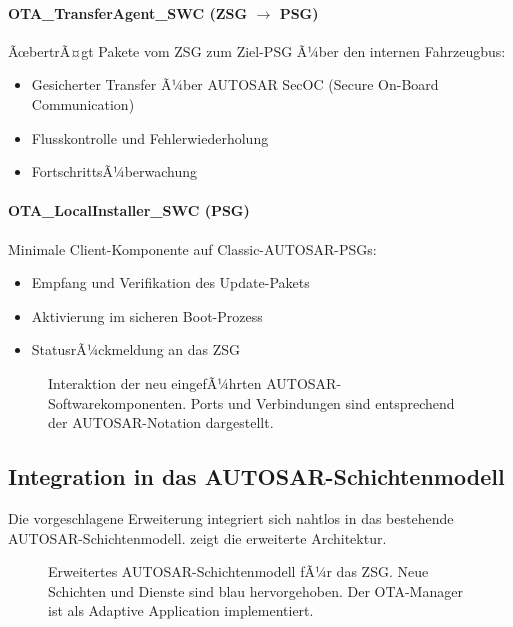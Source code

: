 ﻿\documentclass[12pt,a4paper,twoside]{article}
\begin{document}
\paragraph{OTA\_TransferAgent\_SWC (ZSG $\rightarrow$ PSG)}
ÃœbertrÃ¤gt Pakete vom ZSG zum Ziel-PSG Ã¼ber den internen Fahrzeugbus:
\begin{itemize}
  \item Gesicherter Transfer Ã¼ber AUTOSAR SecOC (Secure On-Board Communication)
  \item Flusskontrolle und Fehlerwiederholung
  \item FortschrittsÃ¼berwachung
\end{itemize}

\paragraph{OTA\_LocalInstaller\_SWC (PSG)}
Minimale Client-Komponente auf Classic-AUTO\-SAR-PSGs:
\begin{itemize}
  \item Empfang und Verifikation des Update-Pakets
  \item Aktivierung im sicheren Boot-Prozess
  \item StatusrÃ¼ckmeldung an das ZSG
\end{itemize}

\begin{figure}[h!]
  \centering
  
  \caption{Interaktion der neu eingefÃ¼hrten AUTOSAR-Softwarekomponenten.
    Ports und Verbindungen sind entsprechend der AUTOSAR-Notation dargestellt.}
  \label{fig:swc_interaction}
\end{figure}

\subsection{Integration in das AUTOSAR-Schichtenmodell}
\label{subsec:schichtenmodell}

Die vorgeschlagene Erweiterung integriert sich nahtlos in das bestehende
AUTO\-SAR-Schichtenmodell.  zeigt die erweiterte
Architektur.

\begin{figure}[h!]
  \centering
  
  \caption{Erweitertes AUTOSAR-Schichtenmodell fÃ¼r das ZSG.
    Neue Schichten und Dienste sind blau hervorgehoben.
    Der OTA-Manager ist als Adaptive Application implementiert.}
  \label{fig:autosar_extended}
\end{figure}
\end{document}

